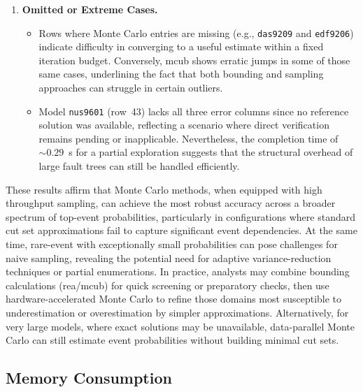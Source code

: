 \begin{enumerate}
    \item \textbf{Omitted or Extreme Cases.}
    \begin{itemize}
        \item Rows where Monte Carlo entries are missing (e.g., \texttt{das9209} and \texttt{edf9206}) indicate difficulty in converging to a useful estimate within a fixed iteration budget. Conversely, \acrshort{mcub} shows erratic jumps in some of those same cases, underlining the fact that both bounding and sampling approaches can struggle in certain outliers.
        \item Model \texttt{nus9601} (row~43) lacks all three error columns since no reference solution was available, reflecting a scenario where direct verification remains pending or inapplicable. Nevertheless, the completion time of \(\sim 0.29\)~s for a partial exploration suggests that the structural overhead of large fault trees can still be handled efficiently.
    \end{itemize}
\end{enumerate}

These results affirm that Monte Carlo methods, when equipped with high throughput sampling, can achieve the most robust accuracy across a broader spectrum of top-event probabilities, particularly in configurations where standard cut set approximations fail to capture significant event dependencies. At the same time, rare-event with exceptionally small probabilities can pose challenges for naive sampling, revealing the potential need for adaptive variance-reduction techniques or partial enumerations. In practice, analysts may combine bounding calculations (\acrshort{rea}/\acrshort{mcub}) for quick screening or preparatory checks, then use hardware-accelerated Monte Carlo to refine those domains most susceptible to underestimation or overestimation by simpler approximations. Alternatively, for very large models, where exact solutions may be unavailable, data-parallel Monte Carlo can still estimate event probabilities without building minimal cut sets. 



\subsection{Memory Consumption}

